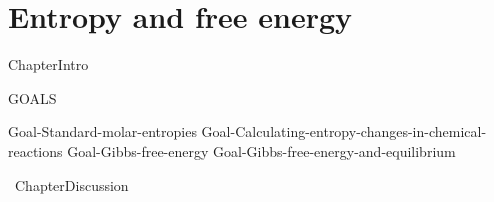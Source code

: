 \documentclass[main.tex]{subfiles}
\begin{document}
\linenumbers
  
\chapter[Entropy and free energy]{Entropy and free energy}
 


      \begin{marginfigure}
\end{marginfigure}


  {ChapterIntro}


\begin{marginfigure}%
\begin{mytcbox}{GOALS}
\begin{enumerate}[label=\protect\circled{\color{white}\arabic*}]
{Goal-Standard-molar-entropies}
{Goal-Calculating-entropy-changes-in-chemical-reactions}	
{Goal-Gibbs-free-energy	}				
{Goal-Gibbs-free-energy-and-equilibrium}			
\end{enumerate}
\end{mytcbox}
\vspace{1cm}
\begin{tcolorbox}[enhanced,colback=red!5!white,colframe=black!50!red,boxrule=1pt,
  arc=0pt,outer arc=0pt,drop heavy lifted shadow]
\faGears\ 
  {ChapterDiscussion}
  \end{tcolorbox}
\end{marginfigure}%
\end{document}
